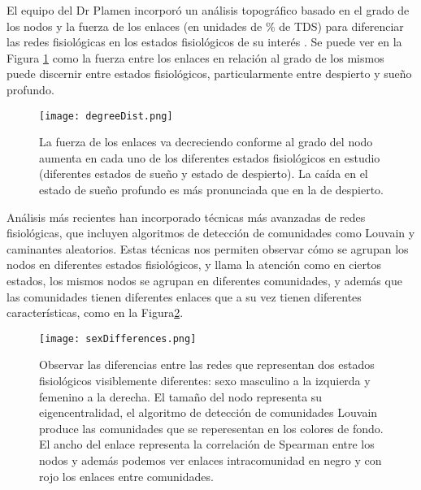 \documentclass[twoside,twocolumn]{article}
\begin{document}
El equipo del Dr Plamen incorporó un análisis topográfico basado en el grado de los nodos y la fuerza de los enlaces (en unidades de \% de TDS) para diferenciar las redes fisiológicas en los estados fisiológicos de su interés \cite{bashan2012network}\cite{2015Plasticity}.
Se puede ver en la Figura \ref{fig:degreeDist} como la fuerza entre los enlaces en relación al grado de los mismos puede discernir entre estados fisiológicos, particularmente entre despierto y sueño profundo.

\begin{figure}[H]
  \texttt{[image: degreeDist.png]}
  \caption{La fuerza de los enlaces va decreciendo conforme al grado del nodo aumenta en cada uno de los diferentes estados fisiológicos en estudio (diferentes estados de sueño y estado de despierto). La caída en el estado de sueño profundo es más pronunciada que en la de despierto.}
  \label{fig:degreeDist}
\end{figure}

Análisis más recientes han incorporado técnicas más avanzadas de redes fisiológicas, que incluyen algoritmos de detección de comunidades como Louvain y caminantes aleatorios\cite{barajas2021sex}\cite{barajas2021physiological}\cite{easton2020metabolic}\cite{chmiel2014spreading}.
Estas técnicas nos permiten observar cómo se agrupan los nodos en diferentes estados fisiológicos, y llama la atención como en ciertos estados, los mismos nodos se agrupan en diferentes comunidades, y además que las comunidades tienen diferentes enlaces que a su vez tienen diferentes características, como en la Figura\ref{fig:sexDifferences}.

\begin{figure}
  \texttt{[image: sexDifferences.png]}
  \caption{Observar las diferencias entre las redes que representan dos estados fisiológicos visiblemente diferentes: sexo masculino a la izquierda y femenino a la derecha. El tamaño del nodo representa su eigencentralidad, el algoritmo de detección de comunidades Louvain produce las comunidades que se reperesentan en los colores de fondo. El ancho del enlace representa la correlación de Spearman entre los nodos y además podemos ver enlaces intracomunidad en negro y con rojo los enlaces entre comunidades.}
  \label{fig:sexDifferences}
\end{figure}
\end{document}
